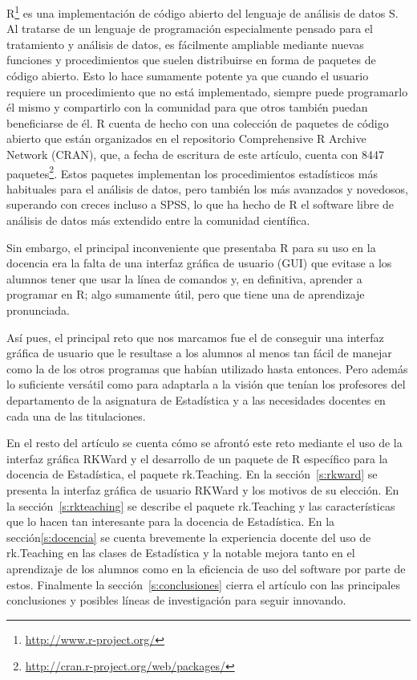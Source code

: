 \documentclass[a4paper,10pt,twoside]{article}
\newcommand{\rkteaching}{\textsf{rk.Teaching}}
\newcommand{\rkward}{\textsf{RKWard}}
\newcommand{\spss}{\textsf{SPSS}}
\begin{document}
R\footnote{\url{http://www.r-project.org/}} \cite{r2001language} es una implementación de código abierto del
lenguaje de análisis de datos S.
Al tratarse de un lenguaje de programación especialmente pensado para el tratamiento y análisis de datos, es fácilmente
ampliable mediante nuevas funciones y procedimientos que suelen distribuirse en forma de paquetes de código abierto.
Esto lo hace sumamente potente ya que cuando el usuario requiere un procedimiento que no está implementado, siempre
puede programarlo él mismo y compartirlo con la comunidad para que otros también puedan beneficiarse de él.
R cuenta de hecho con una colección de paquetes de código abierto que están organizados en el repositorio Comprehensive
R Archive Network (CRAN), que, a fecha de escritura de este artículo, cuenta con 8447
paquetes\footnote{\url{http://cran.r-project.org/web/packages/}}.
Estos paquetes implementan los procedimientos estadísticos más habituales para el análisis de datos, pero también los
más avanzados y novedosos, superando con creces incluso a \spss{}, lo que ha hecho de R el software libre de análisis de
datos más extendido entre la comunidad científica.

Sin embargo, el principal inconveniente que presentaba R para su uso en la docencia era la falta de una interfaz
gráfica de usuario (GUI) que evitase a los alumnos tener que usar la línea de comandos y, en definitiva, aprender a
programar en R; algo sumamente útil, pero que tiene una de aprendizaje pronunciada. 

Así pues, el principal reto que nos marcamos fue el de conseguir una interfaz gráfica de usuario que le resultase a los
alumnos al menos tan fácil de manejar como la de los otros programas que habían utilizado hasta entonces.
Pero además lo suficiente versátil como para adaptarla a la visión que tenían los profesores del departamento de la
asignatura de Estadística y a las necesidades docentes en cada una de las titulaciones.

En el resto del artículo se cuenta cómo se afrontó este reto mediante el uso de la interfaz gráfica \rkward{} y el
desarrollo de un paquete de R específico para la docencia de Estadística, el paquete \rkteaching. 
En la sección~\ref{s:rkward} se presenta la interfaz gráfica de usuario \rkward{} y los motivos de su elección. 
En la sección~\ref{s:rkteaching} se describe el paquete \rkteaching{} y las características que lo hacen tan interesante
para la docencia de Estadística. 
En la sección\ref{s:docencia} se cuenta brevemente la experiencia docente del uso de rk.Teaching en las clases de
Estadística y la notable mejora tanto en el aprendizaje de los alumnos como en la eficiencia de uso del software por
parte de estos. 
Finalmente la sección~\ref{s:conclusiones} cierra el artículo con las principales conclusiones y posibles líneas de
investigación para seguir innovando.
\end{document}
